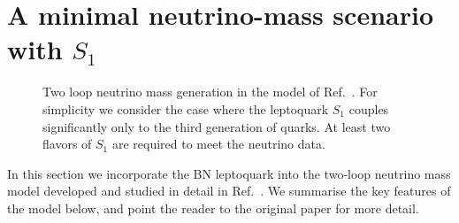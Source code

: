 \section{A minimal neutrino-mass scenario with $S_{1}$}
\label{sec:ch4-s1-mv}

\begin{figure}[t]
  \centering
  \caption{Two loop neutrino mass generation in the model of
    Ref.~\cite{Angel:2013hla}. For simplicity we consider the case where the
    leptoquark $S_{1}$ couples significantly only to the third generation of
    quarks. At least two flavors of $S_{1}$ are required to meet the neutrino
    data.}
  \label{fig:ch4-neutrinomass}
\end{figure}

In this section we incorporate the BN leptoquark into the two-loop neutrino mass
model developed and studied in detail in Ref.~\cite{Angel:2013hla}. We summarise
the key features of the model below, and point the reader to the original paper
for more detail.


